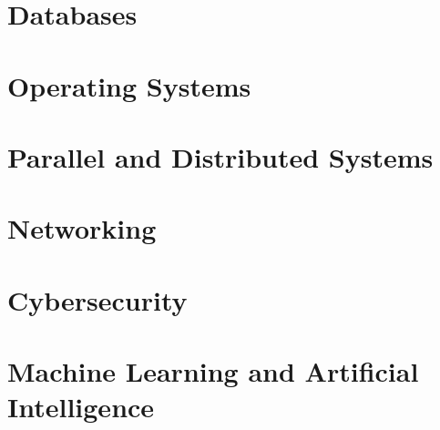 \documentclass[11pt,twoside=semi,openright,numbers=noenddot,titlepage=false]{scrbook}
\begin{document}
\part{Databases}\label{part:db}
\parttoc{}
% 
% 
% 
% 
% 


\part{Operating Systems}\label{part:os}
\parttoc{}
% 
% 
% 
% 
% 
% 


\part{Parallel and Distributed Systems}\label{part:distributed}
\parttoc{}
% 
% 
% 
% 
% 
% 


\part{Networking}\label{part:networking}
\parttoc{}
% 
% 
% 
% 
% 
% 


\part{Cybersecurity}\label{part:cybersec}
\parttoc{}
% 
% 
% 
% 
% 
% 
% 


\part{Machine Learning and Artificial Intelligence}\label{part:ai}
\parttoc{}
% 
% 
% 
% 
% 
% 
% 
\end{document}
